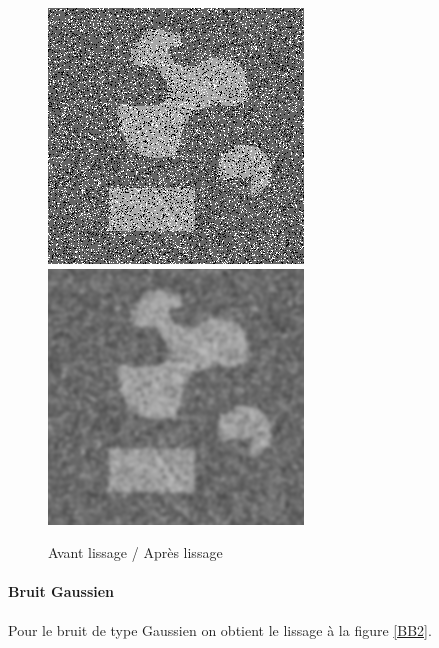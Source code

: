 \documentclass[paper=a4, fontsize=11pt]{scrartcl} %
\begin{document}
\begin{figure}[h!]
\caption{Avant lissage / Après lissage}
\label{PETS2}
\centering
\includegraphics[scale=0.6]{images/rapport/pets/formes2pets5.png} 
\includegraphics[scale=0.6]{images/rapport/pets/pets5sig2.png}
\end{figure}

\paragraph{Bruit Gaussien}
Pour le bruit de type Gaussien on obtient le lissage à la figure \ref{BB2}.
\end{document}
